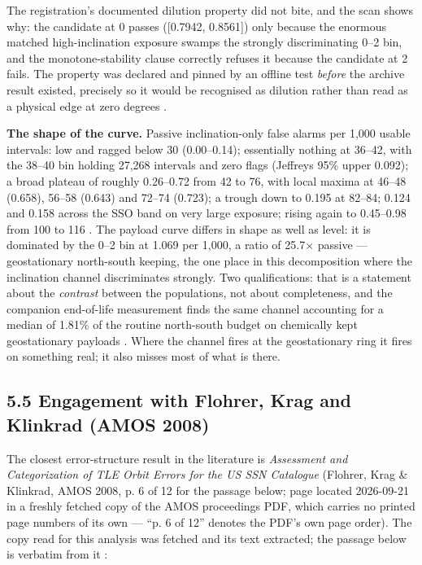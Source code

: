 \documentclass[11pt]{article}
\begin{document}
The registration's documented dilution property did not bite, and the scan shows why: the candidate at 0\textdegree{} passes ([0.7942, 0.8561]) only because the enormous matched high-inclination exposure swamps the strongly discriminating 0--2\textdegree{} bin, and the monotone-stability clause correctly refuses it because the candidate at 2\textdegree{} fails. The property was declared and pinned by an offline test \emph{before} the archive result existed, precisely so it would be recognised as dilution rather than read as a physical edge at zero degrees%
.

\textbf{The shape of the curve.} Passive inclination-only false alarms per 1,000 usable intervals: low and ragged below 30\textdegree{} (0.00--0.14); essentially nothing at 36--42\textdegree{}, with the 38--40\textdegree{} bin holding 27,268 intervals and zero flags (Jeffreys 95\% upper 0.092); a broad plateau of roughly 0.26--0.72 from 42\textdegree{} to 76\textdegree{}, with local maxima at 46--48 (0.658), 56--58 (0.643) and 72--74 (0.723); a trough down to 0.195 at 82--84\textdegree{}; 0.124 and 0.158 across the SSO band on very large exposure; rising again to 0.45--0.98 from 100 to 116\textdegree{}%
. The payload curve differs in shape as well as level: it is dominated by the 0--2\textdegree{} bin at 1.069 per 1,000, a ratio of 25.7$\times$ passive --- geostationary north-south keeping, the one place in this decomposition where the inclination channel discriminates strongly. Two qualifications: that is a statement about the \emph{contrast} between the populations, not about completeness, and the companion end-of-life measurement finds the same channel accounting for a median of 1.81\% of the routine north-south budget on chemically kept geostationary payloads%
. Where the channel fires at the geostationary ring it fires on something real; it also misses most of what is there.

\subsection*{5.5 Engagement with Flohrer, Krag and Klinkrad (AMOS 2008)}

The closest error-structure result in the literature is \emph{Assessment and Categorization of TLE Orbit Errors for the US SSN Catalogue} (Flohrer, Krag \& Klinkrad, AMOS 2008, p. 6 of 12 for the passage below; page located 2026-09-21 in a freshly fetched copy of the AMOS proceedings PDF, which carries no printed page numbers of its own --- ``p. 6 of 12'' denotes the PDF's own page order). The copy read for this analysis was fetched and its text extracted; the passage below is verbatim from it%
:
\end{document}
